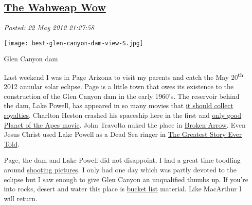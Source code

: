 %

\subsection*{\href{https://bakerjd99.wordpress.com/2012/05/22/the-wahweap-wow/}{The Wahweap Wow}}


\noindent\emph{Posted: 22 May 2012 21:27:58}
\vspace{6pt}



\captionsetup[floatingfigure]{labelformat=empty}
\begin{floatingfigure}[r]{0.32\textwidth}
\centering
\href{http://conceptcontrol.smugmug.com/Trips/USA-and-Canada/Arizona-Toodling-1/7475075\_MrjqMc}{\texttt{[image: best-glen-canyon-dam-view-S.jpg]}}
\caption{Glen Canyon dam}
\label{fig:2818X0}
\end{floatingfigure}Last weekend I was in Page Arizona to visit my parents and catch the May
20\textsuperscript{th} 2012 annular solar eclipse. Page is a little town
that owes its existence to the construction of the Glen Canyon dam in
the early 1960's. The reservoir behind the dam, Lake Powell, has
appeared in so many movies that
\href{http://www.lakepowellrealty.net/lake-powell-movies/}{it should
collect royalties}. Charlton Heston crashed his spaceship here in the first
and
\href{http://en.wikipedia.org/wiki/Planet\_of\_the\_Apes\_(1968\_film)}{only
good Planet of the Apes movie}. John Travolta
nuked the place in \href{http://www.imdb.com/title/tt0115759/}{Broken
Arrow}. Even Jesus Christ used Lake Powell as a Dead Sea ringer in
\href{http://www.imdb.com/title/tt0059245/}{The Greatest Story Ever
Told}.

Page, the dam and Lake Powell did not disappoint. I had a great time
toodling around \href{http://conceptcontrol.smugmug.com/Trips/USA-and-Canada/Arizona-Toodling-1/7475075_MrjqMc}{shooting pictures}. I only 
had one day which was partly
devoted to the eclipse but I saw enough to give Glen Canyon an
unqualified thumbs up. If you're into rocks, desert and water this place
is \href{http://bucketlist.org/}{bucket list} material. Like MacArthur I
will return.



